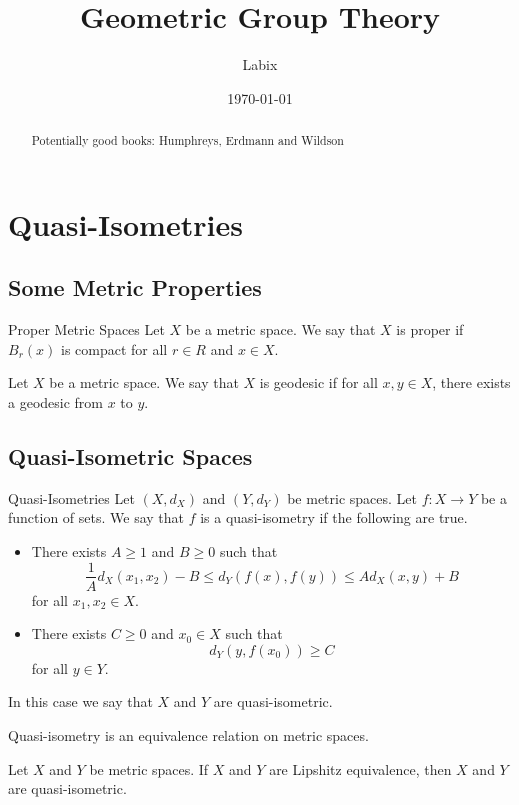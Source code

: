 \documentclass[a4paper]{article}
\title{Geometric Group Theory}
\author{Labix}
\date{\today}
\begin{document}
\maketitle
\begin{abstract}
Potentially good books: Humphreys, Erdmann and Wildson
\end{abstract}
\pagebreak
\tableofcontents

\pagebreak
\section{Quasi-Isometries}
\subsection{Some Metric Properties}
\begin{defn}{Proper Metric Spaces}{} Let $X$ be a metric space. We say that $X$ is proper if $B_r(x)$ is compact for all $r\in R$ and $x\in X$. 
\end{defn}

\begin{defn}{}{} Let $X$ be a metric space. We say that $X$ is geodesic if for all $x,y\in X$, there exists a geodesic from $x$ to $y$. 
\end{defn}

\subsection{Quasi-Isometric Spaces}
\begin{defn}{Quasi-Isometries}{} Let $(X,d_X)$ and $(Y,d_Y)$ be metric spaces. Let $f:X\to Y$ be a function of sets. We say that $f$ is a quasi-isometry if the following are true. 
\begin{itemize}
\item There exists $A\geq 1$ and $B\geq 0$ such that $$\frac{1}{A}d_X(x_1,x_2)-B\leq d_Y(f(x),f(y))\leq Ad_X(x,y)+B$$ for all $x_1,x_2\in X$. 
\item There exists $C\geq 0$ and $x_0\in X$ such that $$d_Y(y,f(x_0))\geq C$$ for all $y\in Y$. 
\end{itemize}
In this case we say that $X$ and $Y$ are quasi-isometric. 
\end{defn}

\begin{prp}{}{} Quasi-isometry is an equivalence relation on metric spaces. 
\end{prp}

\begin{prp}{}{} Let $X$ and $Y$ be metric spaces. If $X$ and $Y$ are Lipshitz equivalence, then $X$ and $Y$ are quasi-isometric. 
\end{prp}
\end{document}
